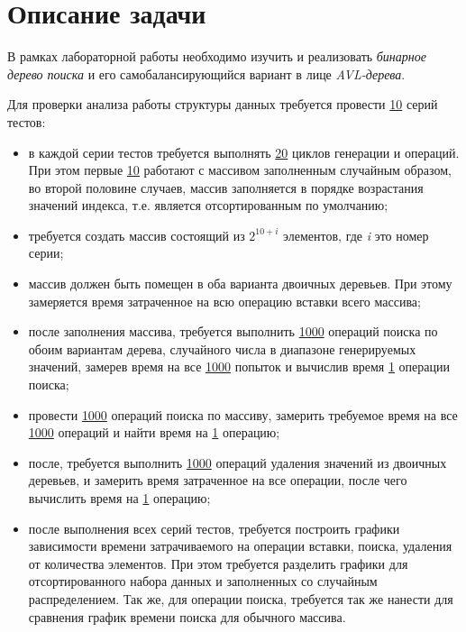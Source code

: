 \documentclass[12pt, a4paper]{report}
\begin{document}
	\section*{Описание задачи}
	\large
	В рамках лабораторной работы необходимо изучить и реализовать \textit{бинарное дерево поиска} и его самобалансирующийся вариант в лице \textit{AVL-дерева}. \par
	Для проверки анализа работы структуры данных требуется провести \underline{10} серий тестов:
	\begin{itemize}
		\item в каждой серии тестов требуется выполнять \underline{20} циклов генерации и операций. При этом первые \underline{10} работают с массивом заполненным случайным образом, во второй половине случаев, массив заполняется в порядке возрастания значений индекса, т.е. является отсортированным по умолчанию;	
		\item требуется создать массив состоящий из \textit{$ 2^{10 + i} $} элементов, где \textit{i} это номер серии;
		\item массив должен быть помещен в оба варианта двоичных деревьев. При этому замеряется время затраченное на всю операцию вставки всего массива;
		\item после заполнения массива, требуется выполнить \underline{1000} операций поиска по обоим вариантам дерева, случайного числа в диапазоне генерируемых значений, замерев время на все \underline{1000} попыток и вычислив время \underline{1} операции поиска;
		\item провести \underline{1000} операций поиска по массиву, замерить требуемое время на все \underline{1000} операций и найти время на \underline{1} операцию;
		\item после, требуется выполнить \underline{1000} операций удаления значений из двоичных деревьев, и замерить время затраченное на все операции, после чего вычислить время на \underline{1} операцию;
		\item после выполнения всех серий тестов, требуется построить графики зависимости времени затрачиваемого на операции вставки, поиска, удаления от количества элементов. При этом требуется разделить графики для отсортированного набора данных и заполненных со случайным распределением. Так же, для операции поиска, требуется так же нанести для сравнения график времени поиска для обычного массива.
	\end{itemize}

	\newpage
\end{document}
